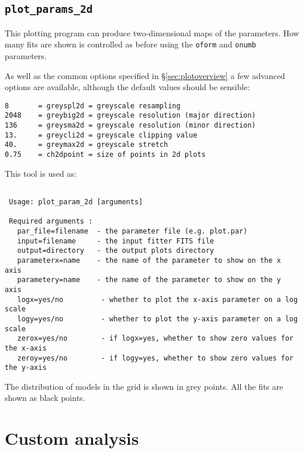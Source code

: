 \documentclass[letterpaper,11pt]{report}
\begin{document}
\section{\texttt{plot\_params\_2d}}

This plotting program can produce two-dimensional maps of the parameters.  How many fits are shown is controlled as before using the \texttt{oform} and \texttt{onumb} parameters.

As well as the common options specified in \S\ref{sec:plotoverview} a few advanced options are available, although the default values should be sensible:

\begin{verbatim}
8       = greyspl2d = greyscale resampling
2048    = greybig2d = greyscale resolution (major direction)
136     = greysma2d = greyscale resolution (minor direction)
13.     = greycli2d = greyscale clipping value
40.     = greymax2d = greyscale stretch
0.75    = ch2dpoint = size of points in 2d plots
\end{verbatim}


This tool is used as:\\

\begin{Verbatim}[frame=single,label=Syntax]

 Usage: plot_param_2d [arguments]
 
 Required arguments :
   par_file=filename  - the parameter file (e.g. plot.par)
   input=filename     - the input fitter FITS file
   output=directory   - the output plots directory
   parameterx=name    - the name of the parameter to show on the x axis
   parametery=name    - the name of the parameter to show on the y axis
   logx=yes/no         - whether to plot the x-axis parameter on a log scale
   logy=yes/no         - whether to plot the y-axis parameter on a log scale
   zerox=yes/no        - if logx=yes, whether to show zero values for the x-axis
   zeroy=yes/no        - if logy=yes, whether to show zero values for the y-axis

\end{Verbatim}

The distribution of models in the grid is shown in grey points. All the fits are shown as black points.\\

\chapter{Custom analysis}
\end{document}
